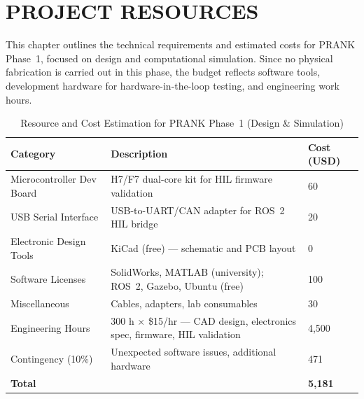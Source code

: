 \chapter{PROJECT RESOURCES}\label{projects_resources}

This chapter outlines the technical requirements and estimated costs for PRANK Phase~1, focused on design and computational simulation. Since no physical fabrication is carried out in this phase, the budget reflects software tools, development hardware for hardware-in-the-loop testing, and engineering work hours.

\begin{table}[htbp]
\centering
\caption{Resource and Cost Estimation for PRANK Phase~1 (Design \& Simulation)}
\begin{tabular}{|p{3.8cm}|p{5.8cm}|p{2.5cm}|}
\hline
\rowcolor{Gray}
\textbf{Category} & \textbf{Description} & \textbf{Cost (USD)} \\
\hline
Microcontroller Dev Board & H7/F7 dual-core kit for HIL firmware validation & 60 \\
\hline
USB Serial Interface & USB-to-UART/CAN adapter for ROS~2 HIL bridge & 20 \\
\hline
Electronic Design Tools & KiCad (free) — schematic and PCB layout & 0 \\
\hline
Software Licenses & SolidWorks, MATLAB (university); ROS~2, Gazebo, Ubuntu (free) & 100 \\
\hline
Miscellaneous & Cables, adapters, lab consumables & 30 \\
\hline
Engineering Hours & 300 h $\times$ \$15/hr — CAD design, electronics spec, firmware, HIL validation & 4,500 \\
\hline
Contingency (10\%) & Unexpected software issues, additional hardware & 471 \\
\hline
\textbf{Total} & & \textbf{5,181} \\
\hline
\end{tabular}
\end{table}
